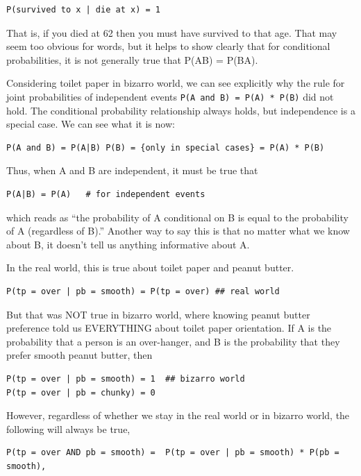 \documentclass[
  openany]{book}
\begin{document}
\begin{verbatim}
P(survived to x | die at x) = 1
\end{verbatim}

That is, if you died at 62 then you must have survived to that age. That may seem too obvious for words, but it helps to show clearly that for conditional probabilities, it is not generally true that P(A\textbar B) = P(B\textbar A).

Considering toilet paper in bizarro world, we can see explicitly why the rule for joint probabilities of independent events \texttt{P(A\ and\ B)\ =\ P(A)\ *\ P(B)} did not hold. The conditional probability relationship always holds, but independence is a special case. We can see what it is now:

\begin{verbatim}
P(A and B) = P(A|B) P(B) = {only in special cases} = P(A) * P(B)
\end{verbatim}

Thus, when A and B are independent, it must be true that

\begin{verbatim}
P(A|B) = P(A)   # for independent events
\end{verbatim}

which reads as ``the probability of A conditional on B is equal to the probability of A (regardless of B).'' Another way to say this is that no matter what we know about B, it doesn't tell us anything informative about A.

In the real world, this is true about toilet paper and peanut butter.

\begin{verbatim}
P(tp = over | pb = smooth) = P(tp = over) ## real world
\end{verbatim}

But that was NOT true in bizarro world, where knowing peanut butter preference told us EVERYTHING about toilet paper orientation. If A is the probability that a person is an over-hanger, and B is the probability that they prefer smooth peanut butter, then

\begin{verbatim}
P(tp = over | pb = smooth) = 1  ## bizarro world
P(tp = over | pb = chunky) = 0
\end{verbatim}

However, regardless of whether we stay in the real world or in bizarro world, the following will always be true,

\begin{verbatim}
P(tp = over AND pb = smooth) =  P(tp = over | pb = smooth) * P(pb = smooth),
\end{verbatim}
\end{document}
